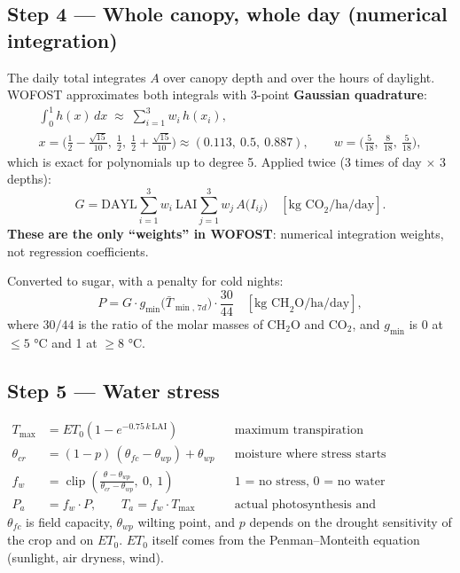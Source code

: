 \documentclass[11pt,a4paper]{article}
\newcommand{\clip}{\operatorname{clip}}
\begin{document}
\subsection*{Step 4 --- Whole canopy, whole day (numerical integration)}
The daily total integrates \(A\) over canopy depth and over the hours of daylight. WOFOST approximates both integrals
with 3-point \textbf{Gaussian quadrature}:
\begin{gather}
  \int_0^1 h(x)\,dx \;\approx\; \sum_{i=1}^{3} w_i\, h(x_i),\\
  x = \Big(\tfrac12 - \tfrac{\sqrt{15}}{10},\ \tfrac12,\ \tfrac12 + \tfrac{\sqrt{15}}{10}\Big)
  \approx (0.113,\ 0.5,\ 0.887),\qquad
  w = \Big(\tfrac{5}{18},\ \tfrac{8}{18},\ \tfrac{5}{18}\Big),
\end{gather}
which is exact for polynomials up to degree 5. Applied twice (3 times of day \(\times\) 3 depths):
\begin{equation}
  G = \mathrm{DAYL}\sum_{i=1}^{3} w_i\ \mathrm{LAI}\sum_{j=1}^{3} w_j\, A\big(I_{ij}\big)
  \quad[\text{kg CO}_2/\text{ha/day}].
\end{equation}
\textbf{These are the only ``weights'' in WOFOST}: numerical integration weights, not regression coefficients.

Converted to sugar, with a penalty for cold nights:
\begin{equation}
  P = G \cdot g_{\min}\big(\bar T_{\min,\,7d}\big)\cdot \frac{30}{44}
  \quad[\text{kg CH}_2\text{O/ha/day}],
\end{equation}
where \(30/44\) is the ratio of the molar masses of CH\(_2\)O and CO\(_2\), and \(g_{\min}\) is 0 at
\(\le 5\) °C and 1 at \(\ge 8\) °C.

\subsection*{Step 5 --- Water stress}
\begin{align}
  T_{\max} &= ET_0\left(1 - e^{-0.75\,k\,\mathrm{LAI}}\right) && \text{maximum transpiration}\\
  \theta_{cr} &= (1-p)\,(\theta_{fc} - \theta_{wp}) + \theta_{wp} && \text{moisture where stress starts}\\
  f_w &= \clip\!\left(\frac{\theta - \theta_{wp}}{\theta_{cr} - \theta_{wp}},\ 0,\ 1\right) && \text{1 = no stress, 0 = no water}\\
  P_a &= f_w \cdot P,\qquad T_a = f_w \cdot T_{\max} && \text{actual photosynthesis and transpiration}
\end{align}
\(\theta_{fc}\) is field capacity, \(\theta_{wp}\) wilting point, and \(p\) depends on the drought sensitivity of the
crop and on \(ET_0\). \(ET_0\) itself comes from the Penman--Monteith equation (sunlight, air dryness, wind).
\end{document}
